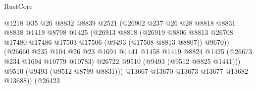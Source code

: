 \begin{lexlean}{RustCore}
\begin{coremodule}
                                        @1218
                                        @35
                                        @26
                                        @8832
                                        @8839
                                        @2521
                                        (@26902
                                          @237
                                          @26
                                          @28
                                          @8818
                                          @8831
                                          @8838
                                          @1419
                                          @8798
                                          @1425
                                          (@26913
                                            @8818
                                            (@26919
                                              @8806
                                              @8813
                                              @26708
                                              @17480
                                              @17486
                                              @17503
                                              @17506
                                              (@9493 (@17508 @8813 @8807))
                                              @9670))
                                          (@26660
                                            @235
                                            @104
                                            @26
                                            @23
                                            @1694
                                            @1441
                                            @1458
                                            @1419
                                            @8824
                                            @1425
                                            (@26673 @234 @1694 @10779 @10783)
                                            @26722
                                            @9510
                                            (@9493 (@9512 @8825 @1441)))
                                          @9510
                                          (@9493 (@9512 @8799 @8831)))
                                        @13667
                                        @13670
                                        @13673
                                        @13677
                                        @13682
                                        @13688))
                                    (@26423

\end{coremodule}
\end{lexlean}
